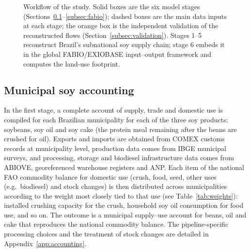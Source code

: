 \documentclass[pdflatex,sn-nature]{sn-jnl}%
\begin{document}
\begin{figure}[htbp]
\caption{Workflow of the study. Solid boxes are the six model stages
(Sections~\ref{subsec:accounting}--\ref{subsec:fabio}); dashed boxes are
the main data inputs at each stage; the orange box is the independent
validation of the reconstructed flows (Section~\ref{subsec:validation}).
Stages 1--5 reconstruct Brazil's subnational soy supply chain; stage 6 embeds
it in the global FABIO/EXIOBASE input--output framework and computes the
land-use footprint.}\label{fig:workflow}
\end{figure}

\subsection{Municipal soy accounting}\label{subsec:accounting}
In the first stage, a complete account of supply, trade and domestic use is
compiled for each Brazilian municipality for each of the three soy
products: soybeans, soy oil and soy cake (the protein meal remaining after
the beans are crushed for oil). Exports and imports are obtained from COMEX
customs records at municipality level, production data comes from IBGE
municipal surveys, and processing, storage and biodiesel infrastructure
data comes from ABIOVE, georeferenced warehouse registers and ANP. Each
item of the national FAO commodity balance for domestic use (crush, food,
seed, other uses (e.g.\ biodiesel) and stock changes) is then distributed
across municipalities according to the weight most closely tied to that use
(see Table~\ref{tab:weights}): installed crushing capacity for the crush,
household soy oil consumption for food use, and so on. The outcome is a
municipal supply--use account for beans, oil and cake that reproduces the
national commodity balance. \textcolor{green!50!black}{The
pipeline-specific processing choices and the treatment of stock
changes are detailed in Appendix~\ref{app:accounting}.}
\end{document}
